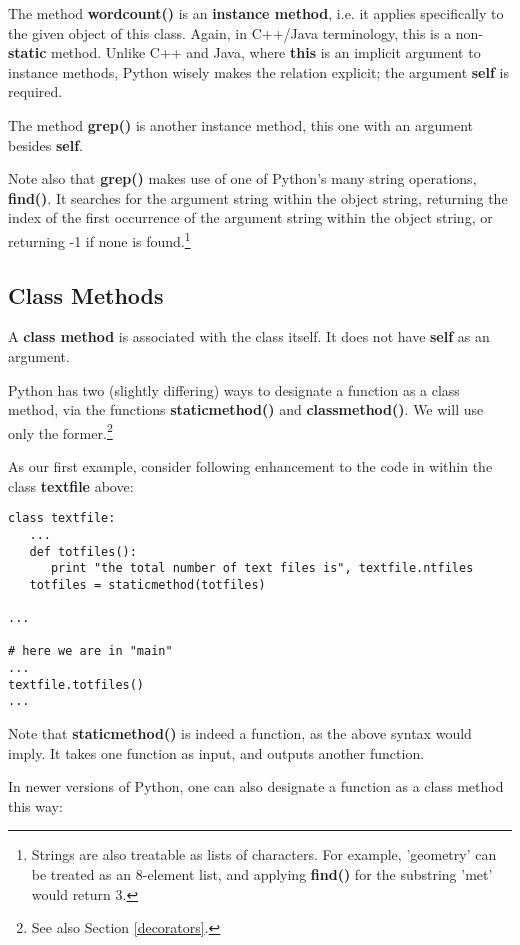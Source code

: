The method {\bf wordcount()} is an {\bf instance method}, i.e. it
applies specifically to the given object of this class.  Again, in
C++/Java terminology, this is a non-{\bf static} method.  Unlike C++ and
Java, where {\bf this} is an implicit argument to instance methods,
Python wisely makes the relation explicit; the argument {\bf self} is
required.  

The method {\bf grep()} is another instance method, this one with an
argument besides {\bf self}.  

Note also that {\bf grep()} makes use of one of Python's many string
operations, {\bf find()}.  It searches for the argument string within
the object string, returning the index of the first occurrence of the
argument string within the object string, or returning -1 if none is
found.\footnote{Strings are also treatable as lists of characters.  For
example, 'geometry' can be treated as an 8-element list, and applying
{\bf find()} for the substring 'met' would return 3.}

\subsection{Class Methods}
\label{cm}

A {\bf class method} is associated with the class itself.  It does not
have {\bf self} as an argument.

Python has two (slightly differing) ways to designate a function as a
class method, via the functions {\bf staticmethod()} and {\bf
classmethod()}.  We will use only the former.\footnote{See also Section
\ref{decorators}.}

As our first example, consider following enhancement to the code in
within the class {\bf textfile} above:

\begin{Verbatim}[fontsize=\relsize{-2}]
class textfile:
   ...
   def totfiles():
      print "the total number of text files is", textfile.ntfiles
   totfiles = staticmethod(totfiles)

...

# here we are in "main"
...
textfile.totfiles()
...
\end{Verbatim}

Note that {\bf staticmethod()} is indeed a function, as the above syntax
would imply.  It takes one function as input, and outputs another
function.

In newer versions of Python, one can also designate a function as a
class method this way:

